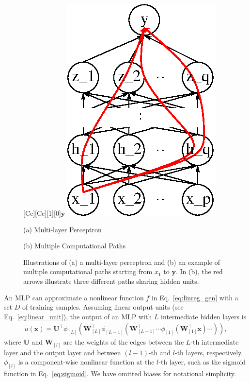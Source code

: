 \documentclass[dissertation,nocontribution,draft*]{aaltoseries}
\newcommand{\qlay}[1]{\left[#1\right]}
\newcommand{\vect}[1]{\mathbf{#1}}
\newcommand{\matr}[1]{\mathbf{#1}}
\newcommand{\vx}[0]{\vect{x}}
\newcommand{\vy}[0]{\vect{y}}
\newcommand{\mW}[0]{\matr{W}}
\newcommand{\mU}[0]{\matr{U}}
\begin{document}
\begin{figure}[t]
\begin{minipage}{0.48\textwidth}
        [Cc][Cc][1][0]{$\vy$}
        \includegraphics[width=0.75\columnwidth]{figures/mlp_multicomp.eps}
    \end{minipage}

    \vspace{2mm}
    \begin{minipage}{0.48\textwidth}
        \centering
        \small
        (a) Multi-layer Perceptron
    \end{minipage}
    \begin{minipage}{0.48\textwidth}
        \centering
        \small
        (b) Multiple Computational Paths
    \end{minipage}
    \caption{Illustrations of (a) a multi-layer perceptron
    and (b) an example of multiple computational paths
    starting from $x_1$ to $\vy$. In (b), the red arrows
    illustrate three different paths sharing hidden units.}
    \label{fig:mlp}
\end{figure}

An MLP can approximate a nonlinear function
$f$ in Eq.~\eqref{eq:linreg_gen} with a set $D$ of training
samples. Assuming linear output units (see
Eq.~\eqref{eq:linear_unit}), the output of an MLP with $L$
intermediate hidden layers is
\begin{align*}
    u(\vx) = \mU^\top \phi_{\qlay{L}} \left(
    \mW_{\qlay{L}}^\top \phi_{\qlay{L-1}} \left(
    \mW_{\qlay{L-1}}^\top \cdots \phi_{\qlay{1}} \left( \mW_{\qlay{1}}^\top \vx \right)
    \cdots \right) \right),
\end{align*}
where $\mU$ and $\mW_{\qlay{l}}$ are the weights of the
edges between the $L$-th intermediate layer and the output
layer and between $(l-1)$-th and $l$-th layers,
respectively.  $\phi_{\qlay{l}}$ is a component-wise
nonlinear function at the $l$-th layer, such as the sigmoid
function in Eq.~\eqref{eq:sigmoid}.  We have omitted biases
for notational simplicity.
\end{document}
